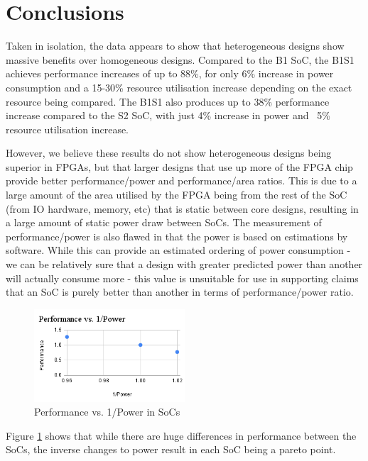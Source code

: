 \section{Conclusions}
Taken in isolation, the data appears to show that heterogeneous designs show massive benefits over homogeneous designs. Compared to the B1 SoC, the B1S1 achieves performance increases of up to 88\%, for only 6\% increase in power consumption and a 15-30\% resource utilisation increase depending on the exact resource being compared. The B1S1 also produces up to 38\% performance increase compared to the S2 SoC, with just 4\% increase in power and ~5\% resource utilisation increase. 

However, we believe these results do not show heterogeneous designs being superior in FPGAs, but that larger designs that use up more of the FPGA chip provide better performance/power and performance/area ratios. This is due to a large amount of the area utilised by the FPGA being from the rest of the SoC (from IO hardware, memory, etc) that is static between core designs, resulting in a large amount of static power draw between SoCs. The measurement of performance/power is also flawed in that the power is based on estimations by software. While this can provide an estimated ordering of power consumption - we can be relatively sure that a design with greater predicted power than another will actually consume more - this value is unsuitable for use in supporting claims that an SoC is purely better than another in terms of performance/power ratio.

\begin{figure}[h!]
    \centering
    \includegraphics[width=0.5\textwidth]{img/Performance vs. 1_Power.png}
    \caption{Performance vs. 1/Power in SoCs}
    \label{fig:perf_v_power}
\end{figure}

Figure \ref{fig:perf_v_power} shows that while there are huge differences in performance between the SoCs, the inverse changes to power result in each SoC being a pareto point.

